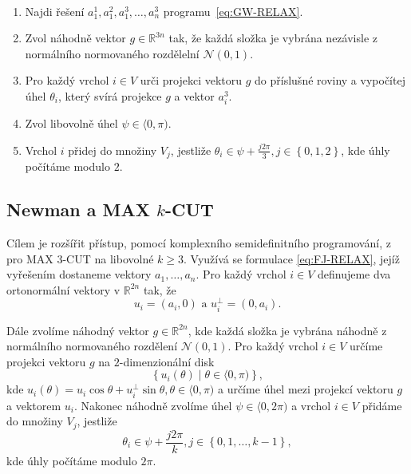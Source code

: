 \begin{alg}\cite{complex-max-3-cut}$ $
    \begin{enumerate}
        \item Najdi řešení $a_1^1, a_1^2, a_1^3, \dots, a_n^3$ programu~\ref{eq:GW-RELAX}.
        \item Zvol náhodně vektor $g \in \mathbb{R}^{3n}$ tak, že každá složka je vybrána nezávisle z normálního normovaného rozdělelní $\mathcal{N}(0,1)$.
        \item Pro každý vrchol $i \in V$ urči projekci vektoru $g$ do příslušné roviny a vypočítej úhel $\theta_i$, který svírá projekce $g$ a vektor $a_i^3$.
        \item Zvol libovolně úhel $\psi \in \langle 0, \pi)$.
        \item Vrchol $i$ přidej do množiny $V_j$, jestliže $\theta_i \in \psi + \frac{j 2 \pi}{3}, j \in \left\{ 0, 1, 2 \right\}$, kde úhly počítáme modulo $2$.
    \end{enumerate}
    \label{alg:gw-max-3-cut}
\end{alg}


\subsection{Newman a MAX $k$-CUT}

Cílem \cite{newman} je rozšířit přístup, pomocí komplexního semidefinitního programování, z \cite{complex-max-3-cut} pro MAX $3$-CUT na libovolné $k \geq 3$. Využívá se formulace \ref{eq:FJ-RELAX}, jejíž vyřešením dostaneme vektory $a_1, \dots, a_n$. Pro každý vrchol $i \in V$ definujeme dva ortonormální vektory v $\mathbb{R}^{2n}$ tak, že
$$
    u_i = \left( a_i, 0 \right) \text{ a } u_i^\bot = \left( 0, a_i \right).
$$

\noindent Dále zvolíme náhodný vektor $g \in \mathbb{R}^{2n}$, kde každá složka je vybrána náhodně z normálního normovaného rozdělení $\mathcal{N}(0,1)$. Pro každý vrchol $i \in V$ určíme projekci vektoru $g$ na $2$-dimenzionální disk
$$
    \left\{ u_i(\theta) \mid \theta \in \langle 0, \pi ) \right\},
$$
kde $u_i(\theta) = u_i \cos \theta + u_i^\bot \sin \theta, \theta \in \langle 0, \pi)$ a určíme úhel mezi projekcí vektoru $g$ a vektorem $u_i$. Nakonec náhodně zvolíme úhel $\psi \in \langle 0, 2 \pi )$ a vrchol $i \in V$ přidáme do množiny $V_j$, jestliže
$$
    \theta_i \in \psi + \frac{j 2 \pi}{k}, j \in \left\{ 0, 1, \dots, k-1 \right\},
$$
kde úhly počítáme modulo $2\pi$.

